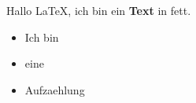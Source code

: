 \documentclass[12pt]{article}
\begin{document}
Hallo \LaTeX, ich bin ein \textbf{Text} in fett.

\begin{itemize}
 \item Ich bin
 \item eine 
 \item Aufzaehlung
\end{itemize}
	
\end{document}
